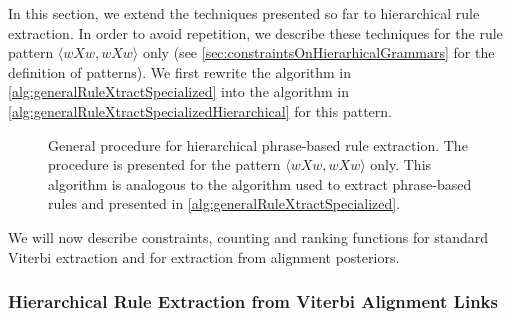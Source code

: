 In this section, we extend the techniques presented so far to hierarchical
rule extraction. In order to avoid repetition, we describe these
techniques for the rule pattern
$\langle w X w, w X w \rangle$
only (see \autoref{sec:constraintsOnHierarhicalGrammars} for the
definition of patterns). We first rewrite the algorithm in
\autoref{alg:generalRuleXtractSpecialized} into the algorithm in
\autoref{alg:generalRuleXtractSpecializedHierarchical} for this pattern.
%
\begin{figure}
  \begin{algorithmic}[1]
         
        \EndIf
         
           
          \EndIf
        \EndFor
         
           
          \EndIf
        \EndFor
      \EndFor
    \EndFunction
  \end{algorithmic}
  \caption{General procedure for hierarchical phrase-based rule extraction. The procedure is presented for the pattern $\langle w X w, w X w \rangle$ only. This algorithm is
  analogous to the algorithm used to extract phrase-based rules and presented
  in \autoref{alg:generalRuleXtractSpecialized}.}
  \label{alg:generalRuleXtractSpecializedHierarchical}
\end{figure}
%
We will now describe constraints, counting and ranking functions for
standard Viterbi extraction and for extraction from alignment posteriors.

\subsubsection{Hierarchical Rule Extraction from Viterbi Alignment Links}

